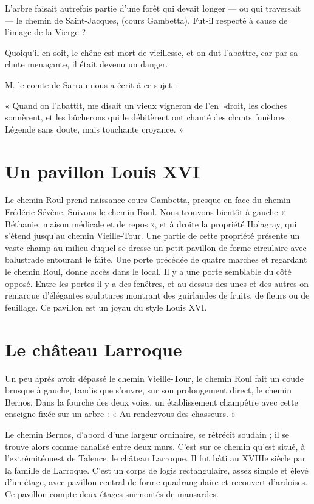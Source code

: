 L'arbre faisait autrefois partie d'une forêt qui devait longer — ou qui traversait — le chemin de Saint-Jacques, (cours Gambetta). Fut-il respecté à cause de l'image de la Vierge ?

Quoiqu'il en soit, le chêne est mort de vieillesse, et on dut l'abattre, car par sa chute menaçante, il était devenu un danger.

M. le comte de Sarrau nous a écrit à ce sujet :

« Quand on l'abattit, me disait un vieux vigneron de l'en¬droit, les cloches sonnèrent, et les bûcherons qui le débitèrent ont chanté des chants funèbres. Légende sans doute, mais touchante croyance. »

\section{Un pavillon Louis XVI}

Le chemin Roul prend naissance cours Gambetta, presque en face du chemin Frédéric-Sévène. Suivons le chemin Roul. Nous trouvons bientôt à gauche « Béthanie, maison médicale et de repos », et à droite la propriété Holagray, qui s'étend jusqu'au chemin Vieille-Tour. Une partie de cette propriété présente un vaste champ au milieu duquel se dresse un petit pavillon de forme circulaire avec balustrade entourant le faîte. Une porte précédée de quatre marches et regardant le chemin Roul, donne accès dans le local. Il y a une porte semblable du côté opposé. Entre les portes il y a des fenêtres, et au-dessus des unes et des autres on remarque d'élégantes sculptures montrant des guirlandes de fruits, de fleurs ou de feuillage. Ce pavillon est un joyau du style Louis XVI.

\section{Le château Larroque}

Un peu après avoir dépassé le chemin Vieille-Tour, le chemin Roul fait un coude brusque à gauche, tandis que s'ouvre, sur son prolongement direct, le chemin Bernos. Dans la fourche des deux voies, un établissement champêtre avec cette enseigne fixée sur un arbre : « Au rendezvous des chasseurs. »

Le chemin Bernos, d'abord d'une largeur ordinaire, se rétrécît soudain ; il se trouve alors comme canalisé entre deux murs. C'est sur ce chemin qu'est situé, à l'extrémitéouest de Talence, le château Larroque. Il fut bâti au XVIIIe siècle par la famille de Larroque. C'est un corps de logis rectangulaire, assez simple et élevé d'un étage, avec pavillon central de forme quadrangulaire et recouvert d'ardoises. Ce pavillon compte deux étages surmontés de mansardes.

